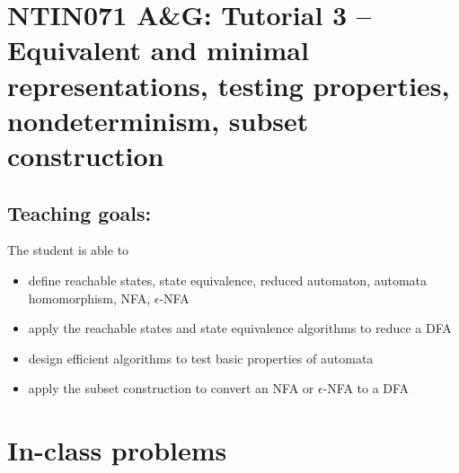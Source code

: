 \documentclass[a4paper,12pt]{amsart}
\begin{document}
\thispagestyle{empty}

\section*{NTIN071 A\&G: Tutorial 3 -- Equivalent and minimal representations, testing properties, nondeterminism, subset construction}

\medskip

\subsection*{Teaching goals:} The student is able to

    \begin{itemize}\setlength{\itemsep}{0pt}
        \item define reachable states, state equivalence, reduced automaton, automata homomorphism, NFA, $\epsilon$-NFA
        \item apply the reachable states and state equivalence algorithms to reduce a DFA
        \item design efficient algorithms to test basic properties of automata
        \item apply the subset construction to convert an NFA or $\epsilon$-NFA to a DFA
    \end{itemize}


\section*{In-class problems}
\end{document}
